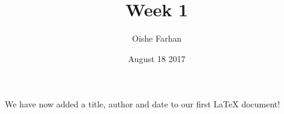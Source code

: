 \documentclass[12pt, letterpaper, twoside]{article}
\title{Week 1}
\author{Oishe Farhan}
\date{August 18 2017}
\begin{document}
 
\maketitle
 
We have now added a title, author and date to our first \LaTeX{} document!
 
\end{document}
